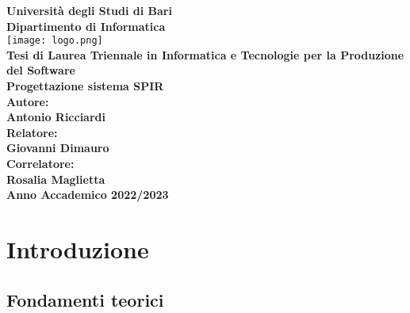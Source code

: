 \documentclass[a4paper,12pt]{report}
\begin{document}

\begin{titlepage}
\centering

\textbf{\large Università degli Studi di Bari} \\
\vspace{0.5cm}
\textbf{\large Dipartimento di Informatica} \\
\vspace{2cm}
\texttt{[image: logo.png]} \\
\vspace{2cm}
\textbf{\large Tesi di Laurea Triennale in Informatica e Tecnologie per la Produzione del Software} \\
\vspace{1cm}
\textbf{\LARGE Progettazione sistema SPIR} \\
\vspace{2cm}
\textbf{\large Autore:} \\
\textbf{Antonio Ricciardi} \\
\vspace{0.5cm}
\textbf{\large Relatore:} \\
\textbf{Giovanni Dimauro} \\
\vspace{0.5cm}
\textbf{\large Correlatore:} \\
\textbf{Rosalia Maglietta} \\
\vfill
\textbf{\large Anno Accademico 2022/2023} %
    
\end{titlepage}

\tableofcontents
\chapter{Introduzione}
\section{Fondamenti teorici}
\end{document}

